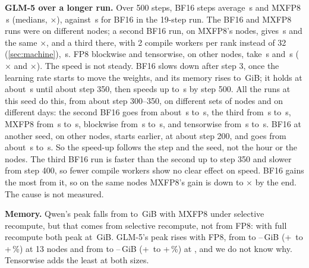 \textbf{GLM-5 over a longer run.} Over 500 steps, BF16 steps average \TriGlmLongStepBf\,s and MXFP8 \TriGlmLongStepMx\,s (medians, $\times$\TriGlmLongFp), against \TriGlmStepBf\,s for BF16 in the 19-step run. The BF16 and MXFP8 runs were on different nodes; a second BF16 run, on MXFP8's nodes, gives \TriGlmLongRepStep\,s and the same $\times$\TriGlmLongFpSame, and a third there, with 2 compile workers per rank instead of 32 (\cref{sec:machine}), \TriGlmLongThirdStep\,s. FP8 blockwise and tensorwise, on other nodes, take \TriGlmLongBlockStep\,s and \TriGlmLongTensorStep\,s ($\times$\TriGlmLongFpBlock{} and $\times$\TriGlmLongFpTensor). The speed is not steady. BF16 slows down after step 3, once the learning rate starts to move the weights, and its memory rises to \TriGlmLongMemBf\,GiB; it holds at about \TriGlmLongBfMid\,s until about step 350, then speeds up to \TriGlmLongBfEnd\,s by step 500. All the runs at this seed do this, from about step 300--350, on different sets of nodes and on different days: the second BF16 goes from about \TriGlmLongRepMid\,s to \TriGlmLongRepEnd\,s, the third from \TriGlmLongThirdMid\,s to \TriGlmLongThirdEnd\,s, MXFP8 from \TriGlmLongMxMid\,s to \TriGlmLongMxEnd\,s, blockwise from \TriGlmLongBlockMid\,s to \TriGlmLongBlockEnd\,s, and tensorwise from \TriGlmLongTensorMid\,s to \TriGlmLongTensorEnd\,s. BF16 at another seed, on other nodes, starts earlier, at about step 200, and goes from about \TriGlmLongSeedMid\,s to \TriGlmLongSeedEnd\,s. So the speed-up follows the step and the seed, not the hour or the nodes. The third BF16 run is faster than the second up to step 350 and slower from step 400, so fewer compile workers show no clear effect on speed. BF16 gains the most from it, so on the same nodes MXFP8's gain is down to $\times$\TriGlmLongFpSameEnd{} by the end. The cause is not measured.

\textbf{Memory.} Qwen's peak falls from \TriQwenMemBf{} to \TriQwenMemMx\,GiB with MXFP8 under selective recompute, but that comes from selective recompute, not from FP8: with full recompute both peak at \TriQwenFullMem\,GiB. GLM-5's peak rises with FP8, from \TriGlmMemBf{} to \TriGlmMemTensor--\TriGlmMemMx\,GiB (+\TriGlmMemPctTensor\ to +\TriGlmMemPctMx\,\%) at 13 nodes and from \TriGlmMemBfTop{} to \TriGlmMemTensorTop--\TriGlmMemMxTop\,GiB (+\TriGlmMemPctTensorTop\ to +\TriGlmMemPctMxTop\,\%) at \TriGlmFpTopNodes, and we do not know why. Tensorwise adds the least at both sizes.

